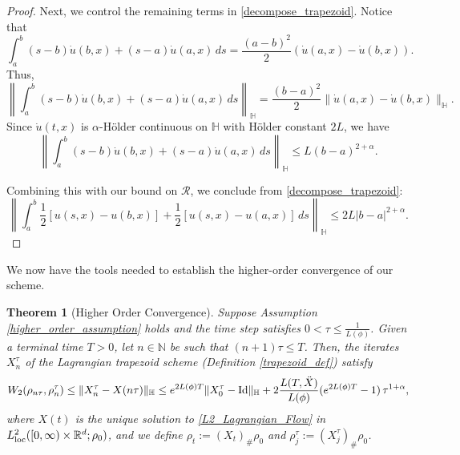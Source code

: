 \documentclass[11pt,a4paper]{amsart}
\newcommand{\1}{\mathds{1}}
\newcommand{\R}{{\mathbb R}}
\newtheorem{theorem}{\textbf{Theorem}}[section]
\numberwithin{equation}{section}
\begin{document}
\begin{proof}
Next, we control the remaining terms in \eqref{decompose_trapezoid}. Notice that
\[
\int_a^b (s-b)\dot{u}(b,x)+(s-a)\dot{u}(a,x)\,ds = \frac{(a-b)^2}{2}(\dot{u}(a,x)-\dot{u}(b,x)).
\] 
Thus, 
\[
\left\|\int_a^b (s-b)\dot{u}(b,x)+(s-a)\dot{u}(a,x)\,ds\right\|_{\mathbb{H}} 
= \frac{(b-a)^2}{2}\|\dot{u}(a,x)-\dot{u}(b,x)\|_{\mathbb{H}}.
\]
Since $\dot{u}(t,x)$ is $\alpha$-Hölder continuous on $\mathbb{H}$ with Hölder constant $2L$, we have
\[
\left\|\int_a^b (s-b)\dot{u}(b,x)+(s-a)\dot{u}(a,x)\,ds\right\|_{\mathbb{H}} 
\leq L(b-a)^{2+\alpha}.
\]

Combining this with our bound on $\mathcal{R}$, we conclude from \eqref{decompose_trapezoid}:
\[
\left\|\int_a^b \frac{1}{2}\left[u(s,x)-u(b,x)\right] + \frac{1}{2}\left[u(s,x)-u(a,x)\right]\,ds\right\|_{\mathbb{H}} \leq 2L|b-a|^{2+\alpha}.
\]
\end{proof}



We now have the tools needed to establish the higher-order convergence of our scheme.

\begin{theorem}[Higher Order Convergence] \label{higher_order_convergence_theorem}
Suppose Assumption \ref{higher_order_assumption} holds and the time step satisfies $0 < \tau \leq \frac{1}{L(\phi)}$. Given a terminal time $T > 0$, let $n \in \mathbb{N}$ be such that $(n+1)\tau \leq T$. Then, the iterates $X_n^{\tau}$ of the Lagrangian trapezoid scheme (Definition \ref{trapezoid_def}) satisfy
\[
W_2(\rho_{n\tau},\rho_n^{\tau}) 
\leq \|X_n^{\tau} - X(n\tau)\|_{\mathbb{H}} 
\leq e^{2 L(\phi) T}\|X_0^{\tau} - \textnormal{Id}\|_{\mathbb{H}} 
+ 2\frac{L(T,\ddot{X})}{L(\phi)}(e^{2 L(\phi) T}-1)\,\tau^{1+\alpha},
\]where $X(t)$ is the unique solution to \eqref{L2_Lagrangian_Flow} in $L^2_{\textnormal{loc}}([0,\infty)\times\R^d;\rho_0)$, and we define $\rho_t := (X_t)_{\#}\rho_0$ and $\rho_j^{\tau} := (X_j^{\tau})_{\#}\rho_0$.

\end{theorem}
\end{document}
